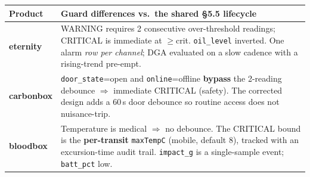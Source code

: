 \documentclass[11pt,a4paper]{article}
\begin{document}
\begin{center}
\renewcommand{\arraystretch}{1.28}
\small
\begin{tabularx}{\textwidth}{@{}p{2.6cm} X@{}}
\toprule
\textbf{Product} & \textbf{Guard differences vs.\ the shared \S5.5 lifecycle} \\
\midrule
\textbf{eternity} & WARNING requires 2 consecutive over-threshold readings; CRITICAL is
  immediate at $\geq$crit. \texttt{oil\_level} inverted. One alarm \emph{row per channel}; DGA
  evaluated on a slow cadence with a rising-trend pre-empt. \\
\textbf{carbonbox} & \texttt{door\_state}=open and \texttt{online}=offline \textbf{bypass} the
  2-reading debounce $\Rightarrow$ immediate CRITICAL (safety). The corrected design adds a
  60\,s door debounce so routine access does not nuisance-trip. \\
\textbf{bloodbox} & Temperature is medical $\Rightarrow$ no debounce. The CRITICAL bound is the
  \textbf{per-transit} \texttt{maxTempC} (mobile, default 8), tracked with an excursion-time
  audit trail. \texttt{impact\_g} is a single-sample event; \texttt{batt\_pct} low. \\
\bottomrule
\end{tabularx}
\end{center}
\end{document}
